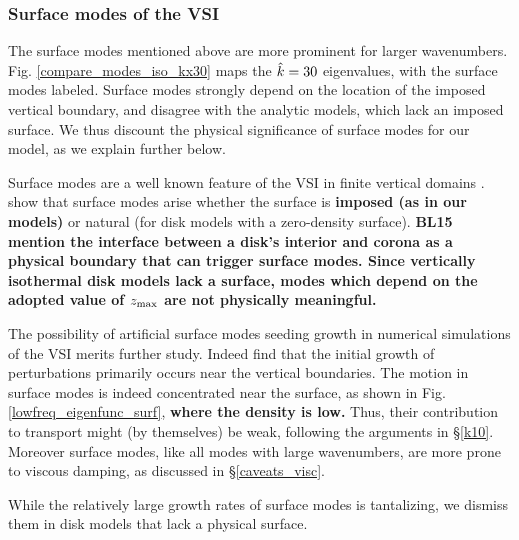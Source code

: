 \subsubsection{Surface modes of the VSI}\label{surf_comment} 
The surface modes mentioned above are more prominent for larger
wavenumbers. Fig. \ref{compare_modes_iso_kx30} maps the $\hat{k} = 30$
eigenvalues, with the surface modes labeled.  Surface modes
strongly depend on the location of the imposed vertical boundary, and
disagree with the analytic models, which lack an imposed surface. We
thus discount the physical significance of surface modes for our
model, as we explain further below.  

Surface modes are a well known feature of the VSI in finite vertical
domains .  show
that surface modes arise whether the surface is {\bf imposed (as in
  our models)} or natural (for disk models with a zero-density surface).
{\bf BL15 mention the interface between a disk's interior and corona
  as a physical boundary that can trigger  surface modes. 
  Since vertically isothermal disk models lack a surface, modes which
  depend on the adopted value of $z_\mathrm{max}$ are not physically meaningful.}


The possibility of artificial surface modes seeding growth in
numerical simulations of the VSI  merits further study. Indeed
 find that the initial growth of perturbations
primarily occurs near the vertical boundaries. 
The motion in surface modes is indeed concentrated near the surface,
as shown in Fig. \ref{lowfreq_eigenfunc_surf}, {\bf where the density
  is low.} 
Thus, their contribution to
transport might (by themselves) be weak,  following the arguments in 
\S\ref{k10}.  Moreover surface modes, like all modes with large
wavenumbers, are more prone to viscous damping, as discussed in
\S\ref{caveats_visc}. 

While the relatively large growth rates of surface modes is
tantalizing, we dismiss them in disk models that lack a physical
surface.  


